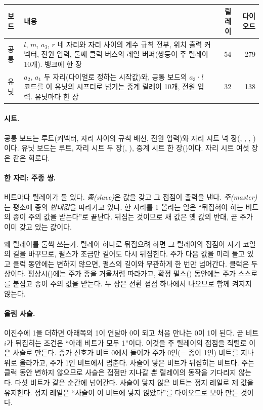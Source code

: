 \begin{table}[ht]
\centering
\small
\begin{tabularx}{\linewidth}{l>{\raggedright\arraybackslash}Xrr}
\toprule
보드 & 내용 & 릴레이 & 다이오드 \\
\midrule
공통 & $l$, $m$, $a_3$, $r$ 네 자리와 자리 사이의 계수 규칙 전부, 위치 출력 커넥터, 전원 입력, 둘째 클럭 버스의
레일 버퍼(쌍둥이 주 릴레이 10개). 뱅크에 한 장 & 54 & 279 \\
유닛 & $a_2$, $a_1$ 두 자리(다이얼로 정하는 시작값)와, 공통 보드의 $a_3$·$l$ 코드를 이 유닛의 시프터로 넘기는
중계 릴레이 10개, 전원 입력. 유닛마다 한 장 & 32 & 138 \\
\bottomrule
\end{tabularx}
\end{table}

\paragraph{시트.} 공통 보드는 루트(커넥터, 자리 사이의 규칙 배선, 전원 입력)와 자리 시트 넉 장(,
, , )이다. 유닛 보드는 루트, 자리 시트 두 장(,
), 중계 시트 한 장()이다. 자리 시트 여섯 장은 같은 회로다.

\paragraph{한 자리: 주종 쌍.} 비트마다 릴레이가 둘 있다. \emph{종(slave)}은 값을 갖고 그 접점이 출력을 낸다.
\emph{주(master)}는 평소에 종의 \emph{반대값}을 따라가고 있다. 한 자리를 1 올리는 일은 ``뒤집혀야 하는 비트의
종이 주의 값을 받는다''로 끝난다. 뒤집는 것이므로 새 값은 옛 값의 반대, 곧 주가 이미 갖고 있는 값이다.

왜 릴레이를 둘씩 쓰는가. 릴레이 하나로 뒤집으려 하면 그 릴레이의 접점이 자기 코일의 길을 바꾸므로, 펄스가
조금만 길어도 다시 뒤집힌다. 주가 다음 값을 미리 들고 있고 클럭 동안에는 변하지 않으면, 펄스의 길이와 무관하게
한 번만 넘어간다. 클럭은 두 상이다. 평상시()에는 주가 종을 거울처럼 따라가고, 확정 펄스()
동안에는 주가 스스로를 붙잡고 종이 주의 값을 받는다. 두 상은 전환 접점 하나에서 나오므로 함께 켜지지 않는다.

\paragraph{올림 사슬.} 이진수에 1을 더하면 아래쪽의 1이 연달아 0이 되고 처음 만나는 0이 1이 된다. 곧 비트
$i$가 뒤집히는 조건은 ``아래 비트가 모두 1''이다. 이것을 주 릴레이의 접점을 직렬로 이은 사슬로 만든다.
증가 신호가 비트 0에서 들어가 주가 0인(= 종이 1인) 비트를 지나 위로 올라가고, 주가 1인 비트에서 멈춘다.
사슬이 닿은 비트가 뒤집히는 비트다. 주는 클럭 동안 변하지 않으므로 사슬은 접점만 지나갈 뿐 릴레이의 동작을
기다리지 않는다. 다섯 비트가 같은 순간에 넘어간다. 사슬이 닿지 않은 비트는 정지 레일로 제 값을 유지한다.
정지 레일은 ``사슬이 이 비트에 닿지 않았다''를 다이오드로 모아 만든 것이다.

